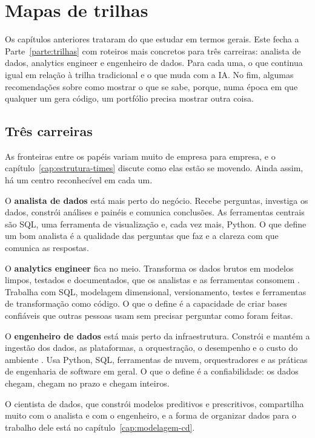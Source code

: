 \chapter{Mapas de trilhas}
\label{cap:mapas}

Os capítulos anteriores trataram do que estudar em termos gerais. Este fecha a
Parte~\ref{parte:trilhas} com roteiros mais concretos para três carreiras: analista de
dados, analytics engineer e engenheiro de dados. Para cada uma, o que continua igual em
relação à trilha tradicional e o que muda com a IA. No fim, algumas recomendações sobre
como mostrar o que se sabe, porque, numa época em que qualquer um gera código, um portfólio
precisa mostrar outra coisa.

\section{Três carreiras}
\label{sec:tres-carreiras}

As fronteiras entre os papéis variam muito de empresa para empresa, e o
capítulo~\ref{cap:estrutura-times} discute como elas estão se movendo. Ainda assim, há um
centro reconhecível em cada um.

O \textbf{analista de dados} está mais perto do negócio. Recebe perguntas, investiga os
dados, constrói análises e painéis e comunica conclusões. As ferramentas centrais são SQL,
uma ferramenta de visualização e, cada vez mais, Python. O que define um bom analista é a
qualidade das perguntas que faz e a clareza com que comunica as respostas.

O \textbf{analytics engineer} fica no meio. Transforma os dados brutos em modelos limpos,
testados e documentados, que os analistas e as ferramentas consomem
\parencite{kaminsky2019}. Trabalha com SQL, modelagem dimensional, versionamento, testes e
ferramentas de transformação como código. O que o define é a capacidade de criar bases
confiáveis que outras pessoas usam sem precisar perguntar como foram feitas.

O \textbf{engenheiro de dados} está mais perto da infraestrutura. Constrói e mantém a
ingestão dos dados, as plataformas, a orquestração, o desempenho e o custo do ambiente
\parencite{reis2022}. Usa Python, SQL, ferramentas de nuvem, orquestradores e as práticas
de engenharia de software em geral. O que o define é a confiabilidade: os dados chegam,
chegam no prazo e chegam inteiros.

O cientista de dados, que constrói modelos preditivos e prescritivos, compartilha muito com
o analista e com o engenheiro, e a forma de organizar dados para o trabalho dele está no
capítulo~\ref{cap:modelagem-cd}.

